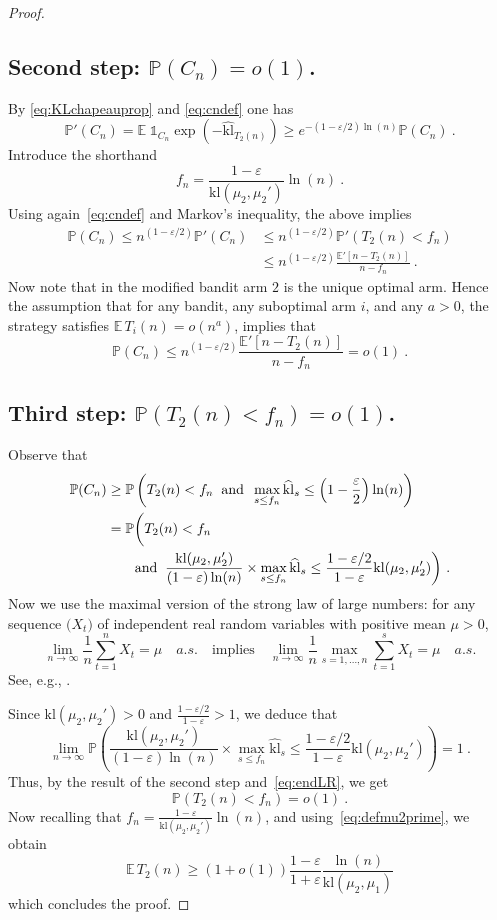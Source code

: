 \documentclass[11pt]{hackednow}
\newcommand{\kl}{\mathrm{kl}}
\renewcommand{\P}{\mathbb{P}}
\newcommand{\E}{\mathbb{E}}
\def\ds1{\mathds{1}}
\renewcommand{\epsilon}{\varepsilon}
\begin{document}
\begin{proof}
\subsection*{Second step: $\P(C_n) = o(1)$.}
By \eqref{eq:KLchapeauprop} and \eqref{eq:cndef} one has
$$\P'(C_n) = \E \; \ds1_{C_n} \exp\left(- \widehat{\kl}_{T_2(n)} \right) \geq e^{- (1-\epsilon/2) \ln(n)} \P(C_n)~.$$
Introduce the shorthand
\[
    f_n = \frac{1-\epsilon}{\kl(\mu_2,\mu_2')} \ln(n)~.
\]
Using again~\eqref{eq:cndef} and Markov's inequality, the above implies
\begin{align*}
\P(C_n) \leq n^{(1-\epsilon/2)} \P'(C_n)
&\leq n^{(1-\epsilon/2)} \P'(T_2(n) < f_n)
\\ &\leq n^{(1-\epsilon/2)} \frac{\E'[n - T_2(n)]}{n - f_n}~.
\end{align*}
Now note that in the modified bandit arm $2$ is the unique optimal arm. Hence the assumption that for any bandit, any suboptimal arm $i$, and any $a>0$, the strategy satisfies $\E\,T_i(n) = o(n^a)$, implies that
$$\P(C_n) \leq n^{(1-\epsilon/2)} \frac{\E'[n - T_2(n)]}{n - f_n} = o(1)~.$$ 

\subsection*{Third step: $\P\left(T_2(n) < f_n \right) = o(1)$.}
%
Observe that
\begin{align}
    \P(C_n)
& \ge
    \P\left(T_2(n) < f_n \;\; \text{and} \;\; \max_{s \le f_n} \widehat{\kl}_s \leq \left(1-\frac{\epsilon}{2}\right) \ln(n) \right)
\notag
\\&=
    \P\biggl(T_2(n) < f_n
\notag
\\&
    \qquad \text{and} \;\; \frac{\kl(\mu_2,\mu_2')}{(1-\epsilon) \ln(n)} \times \max_{s \le f_n} \widehat{\kl}_s \leq \frac{1-\epsilon/2}{1-\epsilon} \kl(\mu_2, \mu_2') \biggr)~.
\label{eq:endLR}
\end{align}
%
Now we use the maximal version of the strong law of large numbers: for any sequence $\bigl(X_t\bigr)$ of independent real random variables with positive mean $\mu > 0$,
\[
    \lim_{n\to\infty}\frac{1}{n}\sum_{t=1}^n X_t = \mu \quad a.s. \quad\text{implies}\quad
\lim_{n\to\infty}\frac{1}{n}\max_{s=1,\dots,n}\sum_{t=1}^s X_t = \mu \quad a.s.
\]
See, e.g., \cite[Lemma 10.5]{Bub10}.

Since $\kl(\mu_2,\mu_2')>0$ and $\frac{1-\epsilon/2}{1-\epsilon} > 1$, we deduce that
$$\lim_{n \to \infty} \P \left(\frac{\kl(\mu_2,\mu_2')}{(1-\epsilon) \ln(n)} \times \max_{s \le f_n} \widehat{\kl}_s \leq \frac{1-\epsilon/2}{1-\epsilon} \kl(\mu_2, \mu_2') \right) = 1~.$$
Thus, by the result of the second step and~\eqref{eq:endLR}, we get
$$\P\left(T_2(n) < f_n\right) = o(1)~.$$
%
Now recalling that $f_n = \frac{1-\epsilon}{\kl(\mu_2,\mu_2')} \ln(n)$, and using~\eqref{eq:defmu2prime}, we obtain
$$\E\,T_2(n) \geq (1+o(1)) \frac{1-\epsilon}{1+\epsilon} \frac{\ln(n)}{\kl(\mu_2,\mu_1)}$$
which concludes the proof.
\end{proof}
\end{document}
